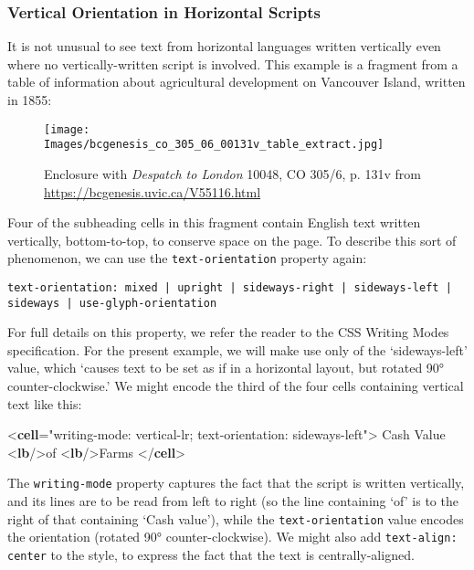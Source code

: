 \subsubsection[{Vertical Orientation in Horizontal Scripts}]{Vertical Orientation in Horizontal Scripts}\label{WDWMEG3}\par
It is not unusual to see text from horizontal languages written vertically even where no vertically-written script is involved. This example is a fragment from a table of information about agricultural development on Vancouver Island, written in 1855: \par
\begin{figure}[htbp]
\noindent\noindent\texttt{[image: Images/bcgenesis\_co\_305\_06\_00131v\_table\_extract.jpg]}
\caption{Enclosure with \textit{Despatch to London} 10048, CO 305/6, p. 131v from \url{https://bcgenesis.uvic.ca/V55116.html}}\end{figure}
\par
Four of the subheading cells in this fragment contain English text written vertically, bottom-to-top, to conserve space on the page. To describe this sort of phenomenon, we can use the \texttt{text-orientation} property again:\par
\texttt{text-orientation: mixed | upright | sideways-right | sideways-left | sideways | use-glyph-orientation}\par
For full details on this property, we refer the reader to the CSS Writing Modes specification. For the present example, we will make use only of the ‘sideways-left’ value, which ‘causes text to be set as if in a horizontal layout, but rotated 90° counter-clockwise.’ We might encode the third of the four cells containing vertical text like this:\par\bgroup{}\exampleFont \begin{shaded}\noindent\mbox{}{<\textbf{cell}\hspace*{1em}{style}="{writing-mode: vertical-lr; text-orientation: sideways-left}">}\mbox{}\newline 
{}Cash Value\mbox{}\newline 
{<\textbf{lb}/>}of\mbox{}\newline 
{<\textbf{lb}/>}Farms\mbox{}\newline 
\mbox{}\newline 
{</\textbf{cell}>}\end{shaded}\egroup\par \par
The \texttt{writing-mode} property captures the fact that the script is written vertically, and its lines are to be read from left to right (so the line containing ‘of’ is to the right of that containing ‘Cash value’), while the \texttt{text-orientation} value encodes the orientation (rotated 90° counter-clockwise). We might also add \texttt{text-align: center} to the style, to express the fact that the text is centrally-aligned.
